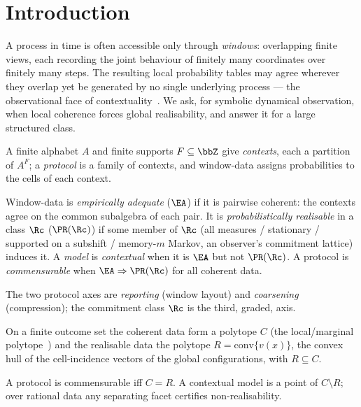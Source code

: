 \section{Introduction}\label{sec:intro}

A process in time is often accessible only through \emph{windows}: overlapping
finite views, each recording the joint behaviour of finitely many coordinates over
finitely many steps. The resulting local probability tables may agree wherever they
overlap yet be generated by no single underlying process --- the observational face
of contextuality~\cite{AbramskyBrandenburger2011}. We ask, for symbolic dynamical
observation, when local coherence forces global realisability, and answer it for a
large structured class.

A finite alphabet $A$ and finite supports $F\subseteq\bbZ$ give \emph{contexts},
each a partition of $A^F$; a \emph{protocol} is a family of contexts, and
window-data assigns probabilities to the cells of each context.

\begin{definition}[$\EA$, $\PR(\Rc)$, commensurability]\label{def:ea-pr}
Window-data is \emph{empirically adequate} ($\EA$) if it is pairwise coherent:
the contexts agree on the common subalgebra of each pair. It is
\emph{probabilistically realisable} in a class $\Rc$ ($\PR(\Rc)$) if some member
of $\Rc$ (all measures / stationary / supported on a subshift / memory-$m$
Markov, an observer's commitment lattice) induces it. A \emph{model} is
\emph{contextual} when it is $\EA$ but not $\PR(\Rc)$. A protocol is
\emph{commensurable} when $\EA \Rightarrow \PR(\Rc)$ for all coherent data.
\end{definition}

The two protocol axes are \emph{reporting} (window layout) and \emph{coarsening}
(compression); the commitment class $\Rc$ is the third, graded, axis.

On a finite outcome set the coherent data form a polytope $C$ (the local/marginal
polytope~\cite{WainwrightJordan2008}) and the realisable data the polytope
$R=\mathrm{conv}\{v(x)\}$, the convex hull of the cell-incidence vectors of the
global configurations, with $R\subseteq C$.

\begin{proposition}[commensurability is $C=R$]\label{prop:cr}
A protocol is commensurable iff $C=R$. A contextual model is a point of
$C\setminus R$; over rational data any separating facet certifies
non-realisability.
\end{proposition}

